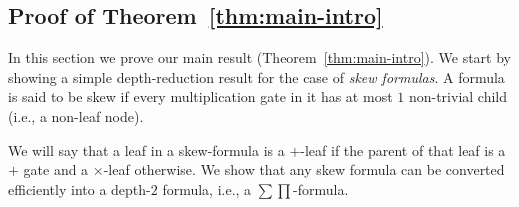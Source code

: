 \documentclass[10pt,a4paper]{article}
\begin{document}
\subsection{Proof of Theorem~\ref{thm:main-intro}}

In this section we prove our main result (Theorem~\ref{thm:main-intro}). 
We start by showing a simple depth-reduction result for the case of \emph{skew formulas}. A formula is said to be skew if every multiplication gate in it has at most $1$ non-trivial child (i.e., a non-leaf node).




We will say that a leaf in a skew-formula is a $+$-leaf if the parent of that leaf is a $+$ gate and a $\times$-leaf otherwise. 
We show that any skew formula can be converted efficiently into a depth-$2$ formula, i.e., a $\sum\prod$-formula.
\end{document}
